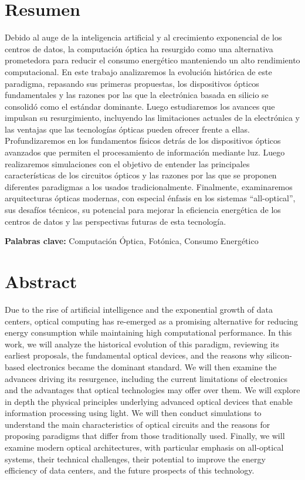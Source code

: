 \documentclass[12pt,a4paper]{report}
\begin{document}


\section*{Resumen}

Debido al auge de la inteligencia artificial y al crecimiento exponencial de los centros de datos, la computación óptica ha resurgido como una alternativa prometedora para reducir el consumo energético manteniendo un alto rendimiento computacional. En este trabajo analizaremos la evolución histórica de este paradigma, repasando sus primeras propuestas, los dispositivos ópticos fundamentales y las razones por las que la electrónica basada en silicio se consolidó como el estándar dominante. Luego estudiaremos los avances que impulsan su resurgimiento, incluyendo las limitaciones actuales de la electrónica y las ventajas que las tecnologías ópticas pueden ofrecer frente a ellas. Profundizaremos en los fundamentos físicos detrás de los dispositivos ópticos avanzados que permiten el procesamiento de información mediante luz. Luego realizaremos simulaciones con el objetivo de entender las principales características de los circuitos ópticos y las razones por las que se proponen diferentes paradigmas a los usados tradicionalmente. Finalmente, examinaremos arquitecturas ópticas modernas, con especial énfasis en los sistemas “all-optical”, sus desafíos técnicos, su potencial para mejorar la eficiencia energética de los centros de datos y las perspectivas futuras de esta tecnología.

\vspace{1cm}
\noindent\textbf{Palabras clave:}
Computación Óptica, Fotónica, Consumo Energético

\clearpage

\section*{Abstract}

Due to the rise of artificial intelligence and the exponential growth of data centers, optical computing has re-emerged as a promising alternative for reducing energy consumption while maintaining high computational performance. In this work, we will analyze the historical evolution of this paradigm, reviewing its earliest proposals, the fundamental optical devices, and the reasons why silicon-based electronics became the dominant standard. We will then examine the advances driving its resurgence, including the current limitations of electronics and the advantages that optical technologies may offer over them. We will explore in depth the physical principles underlying advanced optical devices that enable information processing using light. We will then conduct simulations to understand the main characteristics of optical circuits and the reasons for proposing paradigms that differ from those traditionally used. Finally, we will examine modern optical architectures, with particular emphasis on all-optical systems, their technical challenges, their potential to improve the energy efficiency of data centers, and the future prospects of this technology.
\end{document}
